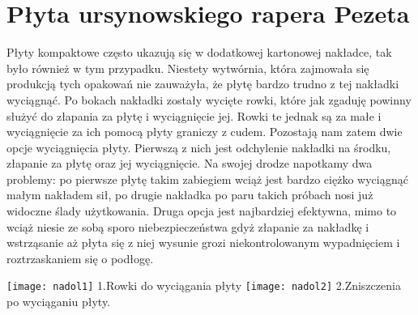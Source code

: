 \documentclass[12pt]{article}
\begin{document}
 \section{Płyta ursynowskiego rapera Pezeta}
 Płyty kompaktowe często ukazują się w dodatkowej kartonowej nakładce, tak było również w tym przypadku. Niestety wytwórnia, która zajmowała się produkcją tych opakowań nie zauważyła, że płytę bardzo trudno z tej nakładki wyciągnąć. Po bokach nakładki zostały wycięte rowki, które jak zgaduję powinny służyć do złapania za płytę i wyciągnięcie jej. Rowki te jednak są za małe i wyciągnięcie za ich pomocą płyty graniczy z cudem. Pozostają nam zatem dwie opcje wyciągnięcia płyty. Pierwszą z nich jest odchylenie nakładki na środku, złapanie za płytę oraz jej wyciągnięcie. Na swojej drodze napotkamy dwa problemy: po pierwsze płytę takim zabiegiem wciąż jest bardzo ciężko wyciągnąć małym nakładem sił, po drugie nakładka po paru takich próbach nosi już widoczne ślady użytkowania. Druga opcja jest najbardziej efektywna, mimo to wciąż niesie ze sobą sporo niebezpieczeństwa gdyż złapanie za nakładkę i wstrząsanie aż płyta się z niej wysunie grozi niekontrolowanym wypadnięciem i roztrzaskaniem się o podłogę.
 \newpage
 \begin{center}
 	\texttt{[image: nadol1]}\newline
 	1.Rowki do wyciągania płyty\newline\newline
 	\texttt{[image: nadol2]}\newline 
 	2.Zniszczenia po wyciąganiu płyty.\newline
 \end{center}
 \newpage
\end{document}
